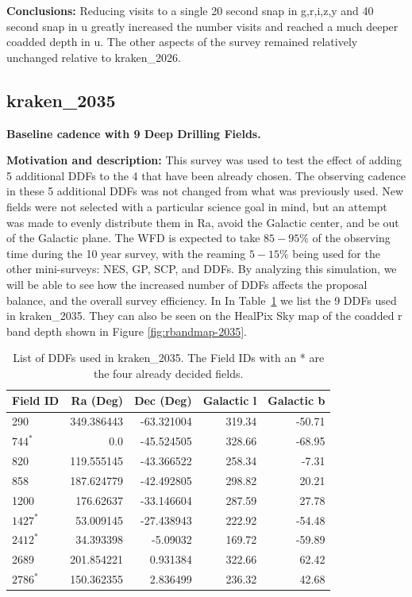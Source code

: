 \documentclass[DM,lsstdraft,authoryear,toc]{lsstdoc}
\begin{document}
  
\textbf{Conclusions:}  Reducing visits to a single 20 second snap in g,r,i,z,y and 40 second snap in u greatly increased
the number visits and reached a much deeper coadded depth in u. The other aspects of the survey remained relatively
unchanged relative to kraken\_2026.


\subsection{kraken\_2035}  \label{kraken2035}

\textbf{Baseline cadence with 9 Deep Drilling Fields.}

\textbf{Motivation and description:} This survey was used to test the effect of adding 5 additional 
DDFs to the 4 that have been already chosen. The observing cadence in these 5 additional DDFs
was not changed from what was previously used. New fields were not selected with a
particular science goal in mind, but an attempt was made to evenly distribute them in Ra, avoid
the Galactic center, and be out of the Galactic plane. The WFD is expected to take $85-95\%$ of
the observing time during the 10 year survey, with the reaming $5-15\%$ being used for the
other mini-surveys: NES, GP, SCP, and DDFs. By analyzing this simulation, we will be able to see
how the increased number of DDFs affects the proposal balance, and the overall survey efficiency. 
In In Table~\ref{tab:ddfs} we list the 9 DDFs used in kraken\_2035. They can also be seen on the
HealPix Sky map of the coadded r band depth shown in Figure \autoref{fig:rbandmap-2035}.

\begin{table}[htp]
\caption{List of DDFs used in kraken\_2035. The Field IDs with an * are the four already decided fields.}
\begin{center}
\small
\begin{tabular}{lrrrr}
\toprule
Field ID & Ra (Deg) & Dec (Deg) & Galactic l & Galactic b \\
\midrule
290  & 349.386443 & -63.321004 & 319.34 & -50.71 \\
$744^{*}$  &   0.0      & -45.524505 & 328.66 & -68.95 \\
820  & 119.555145 & -43.366522 & 258.34 & -7.31 \\
858  & 187.624779 & -42.492805 & 298.82 &  20.21 \\
1200 & 176.62637  & -33.146604 & 287.59 &  27.78 \\
$1427^{*}$ & 53.009145  & -27.438943 & 222.92 & -54.48 \\
$2412^{*}$ & 34.393398  & -5.09032   & 169.72 & -59.89 \\
2689 & 201.854221 &  0.931384  & 322.66 &  62.42 \\
$2786^{*}$ & 150.362355 &  2.836499  & 236.32 &  42.68 \\
\bottomrule
\end{tabular}
\end{center}
\label{tab:ddfs}
\end{table}
\end{document}
